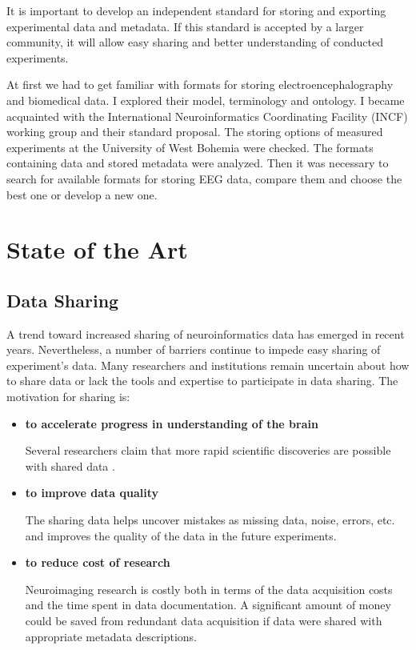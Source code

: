 \documentclass[conference]{IEEEtran}
\begin{document}
It is important to develop an independent standard for storing and exporting experimental data and metadata. If this standard is accepted by a larger community, it will allow easy sharing and better understanding of conducted experiments.

At first we had to get familiar with formats for storing electroencephalography and biomedical data. I explored their model, terminology and ontology. I became acquainted with the International Neuroinformatics Coordinating Facility (INCF) \cite{incfweb} working group and their standard proposal. The storing options of measured experiments at the University of West Bohemia were checked. The formats containing data and stored metadata were analyzed. Then it was necessary to search for available formats for storing EEG data, compare them and choose the best one or develop a new one.

\section{State of the Art}
\subsection{Data Sharing}
A trend toward increased sharing of neuroinformatics data has emerged in recent years. Nevertheless, a number of barriers continue to impede easy sharing of experiment's data. Many researchers and institutions remain uncertain about how to share data or lack the tools and expertise to participate in data sharing. The motivation for sharing is:
\begin{itemize}
	\item \textbf{to accelerate progress in understanding of the brain}
	
	
	Several researchers claim that more rapid scientific discoveries are possible with shared data \cite{Milham2012} \cite{Poldrack2012}.
	\item \textbf{to improve data quality}
	
	The sharing data helps uncover mistakes as missing data, noise, errors, etc. and improves the quality of the data in the future experiments.
	\item  \textbf{to reduce cost of research}
	
	Neuroimaging research is costly both in terms of the data acquisition costs and the time spent in data documentation. A significant amount of money could be saved from redundant data acquisition if data were shared with appropriate metadata descriptions. \cite{Poline2012}
	\end{itemize}
\end{document}
